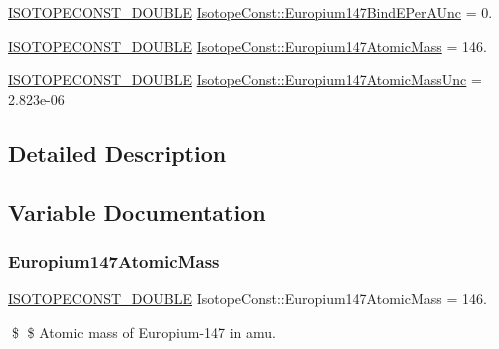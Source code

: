\begin{DoxyCompactItemize}
\mbox{\hyperlink{group___isotope_const-_macros_ga8f45a7272ce02c0b4c65c44636ed719a}{I\+S\+O\+T\+O\+P\+E\+C\+O\+N\+S\+T\+\_\+\+D\+O\+U\+B\+LE}} \mbox{\hyperlink{group___isotope_const-_europium-_eu147_ga898cb503a6b878fe2911a5c993eccbb3}{Isotope\+Const\+::\+Europium147\+Bind\+E\+Per\+A\+Unc}} = 0.
\item 
\mbox{\hyperlink{group___isotope_const-_macros_ga8f45a7272ce02c0b4c65c44636ed719a}{I\+S\+O\+T\+O\+P\+E\+C\+O\+N\+S\+T\+\_\+\+D\+O\+U\+B\+LE}} \mbox{\hyperlink{group___isotope_const-_europium-_eu147_gadf5ff26f7d2c6bb116e684076f5af33f}{Isotope\+Const\+::\+Europium147\+Atomic\+Mass}} = 146.
\item 
\mbox{\hyperlink{group___isotope_const-_macros_ga8f45a7272ce02c0b4c65c44636ed719a}{I\+S\+O\+T\+O\+P\+E\+C\+O\+N\+S\+T\+\_\+\+D\+O\+U\+B\+LE}} \mbox{\hyperlink{group___isotope_const-_europium-_eu147_ga80c1dd3c86e9c9318982a76769559946}{Isotope\+Const\+::\+Europium147\+Atomic\+Mass\+Unc}} = 2.\+823e-\/06
\end{DoxyCompactItemize}


\subsection{Detailed Description}


\subsection{Variable Documentation}
\mbox{\label{group___isotope_const-_europium-_eu147_gadf5ff26f7d2c6bb116e684076f5af33f}} 
\subsubsection{\texorpdfstring{Europium147\+Atomic\+Mass}{Europium147AtomicMass}}
{\footnotesize\ttfamily \mbox{\hyperlink{group___isotope_const-_macros_ga8f45a7272ce02c0b4c65c44636ed719a}{I\+S\+O\+T\+O\+P\+E\+C\+O\+N\+S\+T\+\_\+\+D\+O\+U\+B\+LE}} Isotope\+Const\+::\+Europium147\+Atomic\+Mass = 146.}

\$ \$ Atomic mass of Europium-\/147 in amu. \mbox{\label{group___isotope_const-_europium-_eu147_ga80c1dd3c86e9c9318982a76769559946}} 
